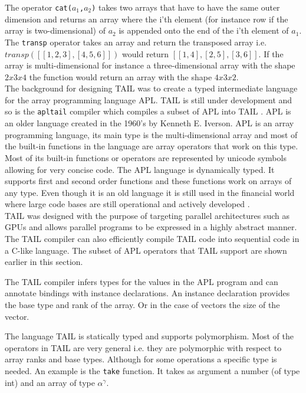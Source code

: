 \documentclass[11pt]{article}
\begin{document}
The operator {\tt cat($a_1$,$a_2$)} takes two arrays that have to have the same outer dimension and returns an array where the i'th element (for instance row if the array is two-dimensional) of $a_2$ is appended onto the end of the i'th element of $a_1$.\\

The {\tt transp} operator takes an array and return the transposed array i.e.\\
 $transp([[1,2,3],[4,5,6]])$ would return $[[1,4],[2,5],[3,6]]$. If the array is multi-dimensional for instance a three-dimensional array with the shape $2x3x4$ the function would return an array with the shape $4x3x2$.\\

The background for designing TAIL was to create a typed intermediate language for the array programming language APL.
TAIL is still under development and so is the {\tt apltail} compiler which compiles a subset of APL into
TAIL \cite{ElsmanDybdal:Array:2014}.
APL is an older language created in the 1960's by Kenneth E. Iverson.
APL is an array programming language, its main type is the multi-dimensional array 
and most of the built-in functions in the language are array operators that work on this type. 
Most of its built-in functions or operators are represented by unicode symbols allowing for very concise code.
The APL language is dynamically typed. It supports first and second order functions and these functions work on arrays of any type. 
Even though it is an old language it is still used in the financial world 
where large code bases are still operational and actively developed \cite{ElsmanDybdal:Array:2014}. \\

TAIL was designed with the purpose of targeting parallel architectures such as GPUs and allows parallel programs to be
expressed in a highly abstract manner.
The TAIL compiler can also efficiently compile TAIL code into sequential code in a C-like language.
The subset of APL operators that TAIL support are shown earlier in this section.

The TAIL compiler infers types for the values in the APL program and can annotate bindings with
instance declarations. An instance declaration provides the base type and rank of the array. Or in
the case of vectors the size of the vector.

The language TAIL is statically typed and supports polymorphism. 
Most of the operators in TAIL are very general i.e. they are polymorphic with respect to array ranks and base types.
Although for some operations a specific type is needed.
An example is the {\tt take} function. It takes as argument a number (of type int) and an array of type $\alpha^\gamma$.\\
\end{document}
